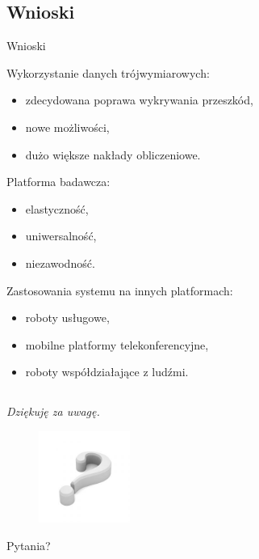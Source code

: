 \documentclass[xcolor=x11names,compress]{beamer}
\renewcommand{\(}{\begin{columns}}
\renewcommand{\)}{\end{columns}}
\newcommand{\<}[1]{\begin{column}{#1}}
\renewcommand{\>}{\end{column}}
\begin{document}
\subsection*{Wnioski}
\begin{frame}{Wnioski}

\alert{Wykorzystanie danych trójwymiarowych:}
\begin{itemize}
\item zdecydowana poprawa wykrywania przeszkód,
\item nowe możliwości,
\item dużo większe nakłady obliczeniowe.
\end{itemize}

\vspace{.2cm}

\alert{Platforma badawcza:}
\begin{itemize}
\item elastyczność,
\item uniwersalność,
\item niezawodność.
\end{itemize}

\vspace{.2cm}

\alert{Zastosowania systemu na innych platformach:}
\begin{itemize}
\item roboty usługowe,
\item mobilne platformy telekonferencyjne,
\item roboty współdziałające z ludźmi.
\end{itemize}

\end{frame}

\subsection*{}
\begin{frame}{}

\it
\Large{Dziękuję za uwagę.}

\begin{figure}[h!]
\centering
\includegraphics[width=3cm]{../Common/img/qmark}
\end{figure}

\hfill\Large{Pytania?}

\end{frame}





\end{document}
